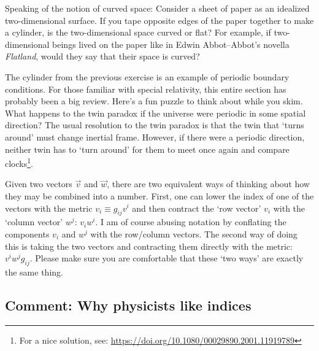 \begin{exercise}
Speaking of the notion of curved space: Consider a sheet of paper as an idealized two-dimensional surface. If you tape opposite edges of the paper together to make a cylinder, is the two-dimensional space curved or flat? For example, if two-dimensional beings lived on the paper like in Edwin Abbot--Abbot's novella \emph{Flatland}, would they say that their space is curved? 
\end{exercise}
\begin{exercise}
The cylinder from the previous exercise is an example of periodic boundary conditions. For those familiar with special relativity, this entire section has probably been a big review. Here's a fun puzzle to think about while you skim. What happens to the twin paradox if the universe were periodic in some spatial direction? The usual resolution to the twin paradox is that the twin that `turns around' must change inertial frame. However, if there were a periodic direction, neither twin has to `turn around' for them to meet once again and compare clocks\footnote{For a nice solution, see: \url{https://doi.org/10.1080/00029890.2001.11919789}}.
\end{exercise}
\begin{example}\label{eg:two:ways:to:contract}
Given two vectors $\vec v$ and $\vec w$, there are two equivalent ways of thinking about how they may be combined into a number. First, one can lower the index of one of the vectors with the metric $v_i \equiv g_{ij}v^i$ and then contract the `row vector' $v_i$ with the `column vector' $w^j$: $v_iw^i$. I am of course abusing notation by conflating the components $v_i$ and $w^j$ with the row/column vectors. The second way of doing this is taking the two vectors and contracting them directly with the metric: $v^i w^j g_{ij}$. Please make sure you are comfortable that these `two ways' are exactly the same thing.
\end{example}

\subsection{Comment: Why physicists like indices}

